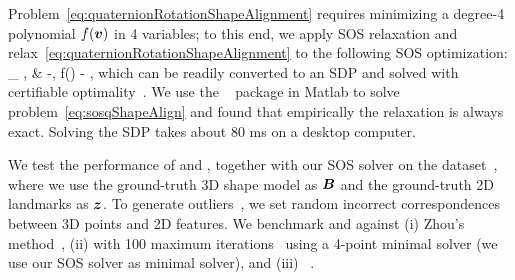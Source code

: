 Problem~\eqref{eq:quaternionRotationShapeAlignment} requires minimizing  a degree-4 polynomial $f({\bm v})$ in 4 variables; 
to this end, we apply SOS relaxation and relax~\eqref{eq:quaternionRotationShapeAlignment} to the following SOS optimization:
\bea \label{eq:sosqShapeAlign}
\min_{ \vv \in {}, \gamma \in \Real{} }  & -\gamma \quad , \quad {}\quad f(\vv) - \gamma {},
\eea
which can be readily converted to an SDP and solved with certifiable optimality~\cite{Blekherman12Book-sdpandConvexAlgebraicGeometry}. We use the \gPoly~\cite{henrion2009optimmethodsoftw-gloptipoly3} package in Matlab to solve problem~\eqref{eq:sosqShapeAlign} and found that empirically the relaxation is always exact. 
 Solving the SDP takes about 80 ms on a desktop computer.


We test the performance of \GNCGM and \GNCTLS, together with our SOS solver on the \FGCar dataset~\cite{Lin14eccv-modelFitting}, where we use the ground-truth 3D shape model as ${\bm B}$ and the ground-truth 2D landmarks as ${\bm z}$. 
To generate outliers~, we set random incorrect correspondences between 3D points and 2D features. %
We benchmark \GNCGM and \GNCTLS against (i) Zhou's method~\cite{Zhou17pami-shapeEstimationConvex}, (ii) \ransac with 100 maximum iterations~ using a 4-point minimal solver (we use our SOS solver as minimal solver), and (iii) \adapt~\cite{Tzoumas19iros-outliers}. 
% 

